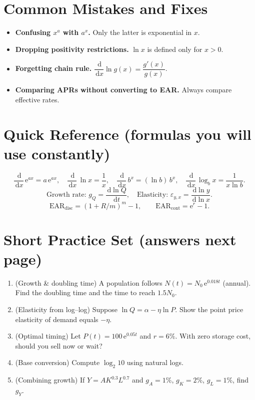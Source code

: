 \documentclass[12pt]{article}
\newcommand{\dd}{\,\mathrm{d}}
\newcommand{\e}{\mathrm{e}}
\newcommand{\1}{\mathbf{1}}
\theoremstyle{definition}
\theoremstyle{plain}
\begin{document}
\section*{Common Mistakes and Fixes}
\begin{itemize}[leftmargin=1.2em]
\item \textbf{Confusing \(x^a\) with \(a^x\).} Only the latter is exponential in \(x\).
\item \textbf{Dropping positivity restrictions.} \(\ln x\) is defined only for \(x>0\).
\item \textbf{Forgetting chain rule.} \(\dfrac{\dd}{\dd x}\ln g(x)=\dfrac{g'(x)}{g(x)}\).
\item \textbf{Comparing APRs without converting to EAR.} Always compare effective rates.
\end{itemize}

\section*{Quick Reference (formulas you will use constantly)}
\[
\frac{\dd}{\dd x}\,\e^{ax}=a\,\e^{ax},\quad
\frac{\dd}{\dd x}\,\ln x=\frac{1}{x},\quad
\frac{\dd}{\dd x}\,b^x=(\ln b)\,b^x,\quad
\frac{\dd}{\dd x}\,\log_b x=\frac{1}{x\ln b}.
\]
\[
\text{Growth rate: } g_Q=\frac{\dd \ln Q}{\dd t},\quad
\text{Elasticity: } \varepsilon_{y,x}=\frac{\dd \ln y}{\dd \ln x}.
\]
\[
\text{EAR}_{\text{disc}}=(1+R/m)^m-1,\qquad
\text{EAR}_{\text{cont}}=\e^{r}-1.
\]

\section*{Short Practice Set (answers next page)}
\begin{enumerate}[label=\textbf{P\arabic*.}]
\item (Growth \& doubling time) A population follows \(N(t)=N_0\,\e^{0.018t}\) (annual). Find the doubling time and the time to reach \(1.5N_0\).
\item (Elasticity from log--log) Suppose \(\ln Q=\alpha-\eta\ln P\). Show the point price elasticity of demand equals \(-\eta\).
\item (Optimal timing) Let \(P(t)=100\,\e^{0.05 t}\) and \(r=6\%\). With zero storage cost, should you sell now or wait?
\item (Base conversion) Compute \(\log_{2} 10\) using natural logs.
\item (Combining growth) If \(Y=A K^{0.3}L^{0.7}\) and \(g_{A}=1\%\), \(g_K=2\%\), \(g_L=1\%\), find \(g_Y\).
\end{enumerate}
\end{document}
